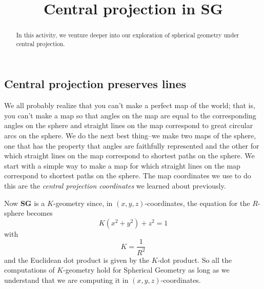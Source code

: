 \documentclass{ximera}
\title{Central projection in SG}
\begin{document}
\begin{abstract}
In this activity, we venture deeper into our exploration of spherical
geometry under central projection.
\end{abstract}
\maketitle

\subsection*{Central projection preserves lines}

We all probably realize that you can't make a perfect map of the world; that
is, you can't make a map so that angles on the map are equal to the
corresponding angles on the sphere and straight lines on the map correspond to
great circular arcs on the sphere. We do the next best thing--we make two maps
of the sphere, one that has the property that angles are faithfully
represented and the other for which straight lines on the map correspond to
shortest paths on the sphere. We start with a simple way to make a map for
which straight lines on the map correspond to shortest paths on the sphere.
The map coordinates we use to do this are the \textit{central projection
coordinates} we learned about previously.%

Now \textbf{SG} is a $K$-geometry %
since, in
$\left(  x,y,z\right)  $-coordinates, the equation for the $R$-sphere becomes%
\[
K\left(  x^{2}+y^{2}\right)  +z^{2}=1
\]
with%
\[
K=\frac{1}{R^{2}}%
\]
and the Euclidean dot product is given by the $K$-dot product. So all
the computations of $K$-geometry hold for Spherical Geometry as long
as we understand that we are computing it in $\left( x,y,z\right)
$-coordinates.
\end{document}

